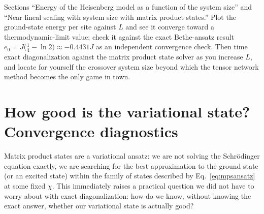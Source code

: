 \documentclass[all_sessions.tex]{subfiles}
\begin{document}
\begin{notebook}
Sections ``Energy of the Heisenberg model as a function of the system size'' and ``Near lineal
scaling with system size with matrix product states.'' Plot the ground-state energy per site
against $L$ and see it converge toward a thermodynamic-limit value; check it against the exact
Bethe-ansatz result $e_0 = J\big(\tfrac14-\ln2\big)\approx-0.4431J$ as an independent convergence
check. Then time exact diagonalization against the matrix product state solver as you increase
$L$, and locate for yourself the crossover system size beyond which the tensor network method
becomes the only game in town.
\end{notebook}

\section{How good is the variational state? Convergence diagnostics}
Matrix product states are a variational ansatz: we are not solving the Schr\"odinger equation
exactly, we are searching for the best approximation to the ground state (or an excited state)
within the family of states described by Eq.~\eqref{eq:mpsansatz} at some fixed $\chi$. This
immediately raises a practical question we did not have to worry about with exact diagonalization:
how do we know, without knowing the exact answer, whether our variational state is actually good?
\end{document}
